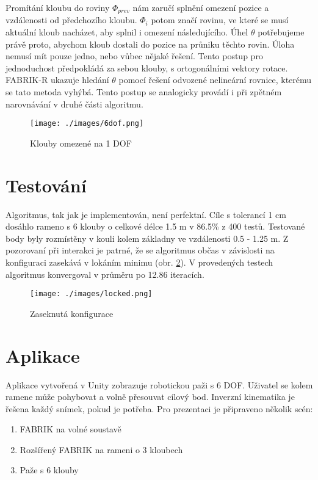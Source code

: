 \documentclass[czech]{pyt-report}
\begin{document}
\noindent Promítání kloubu do roviny $\Phi_{prev}$ nám zaručí splnění omezení pozice a vzdálenosti od předchozího kloubu. $\Phi_{i}$ potom značí rovinu, ve které se musí aktuální kloub nacházet, aby splnil i omezení následujícího. Úhel $\theta$ potřebujeme právě proto, abychom kloub dostali do pozice na průniku těchto rovin. Úloha nemusí mít pouze jedno, nebo vůbec nějaké řešení. Tento postup pro jednoduchost předpokládá za sebou klouby, s ortogonálními vektory rotace. FABRIK-R\cite{bib:fabrik-r} ukazuje hledání $\theta$ pomocí řešení odvozené nelineární rovnice, kterému se tato metoda vyhýbá. Tento postup se analogicky provádí i při zpětném narovnávání v druhé části algoritmu.

\begin{figure}[h]
  \centering\leavevmode
  \texttt{[image: ./images/6dof.png]}\vskip-0.5cm
  \medskip
  \caption{Klouby omezené na 1 DOF}
  \label{fig:constrained-system}
\end{figure}

\section{Testování}
\label{sec:testovani}
Algoritmus, tak jak je implementován, není perfektní. Cíle s tolerancí 1 cm dosáhlo rameno s 6 klouby o celkové délce 1.5 m v 86.5\% z 400 testů. Testované body byly rozmístěny v kouli kolem základny ve vzdálenosti 0.5 - 1.25 m. Z pozorovaní při interakci je patrné, že se algoritmus občas v závislosti na konfiguraci zasekává v lokáním minimu (obr. \ref{fig:locked-configuration}). V provedených testech algoritmus konvergoval v průměru po 12.86 iteracích.

\begin{figure}[h]
  \centering\leavevmode
  \texttt{[image: ./images/locked.png]}\vskip-0.5cm
  \medskip
  \caption{Zaseknutá konfigurace}
  \label{fig:locked-configuration}
\end{figure}

\section{Aplikace}
\label{sec:aplikace}
Aplikace vytvořená v Unity\cite{bib:unity} zobrazuje robotickou paži s 6 DOF. Uživatel se kolem ramene může pohybovat a volně přesouvat cílový bod. Inverzní kinematika je řešena každý snímek, pokud je potřeba. Pro prezentaci je připraveno několik scén:
\begin{enumerate}
  \item FABRIK na volné soustavě
  \item Rozšířený FABRIK na rameni o 3 kloubech
  \item Paže s 6 klouby
\end{enumerate}
\end{document}
